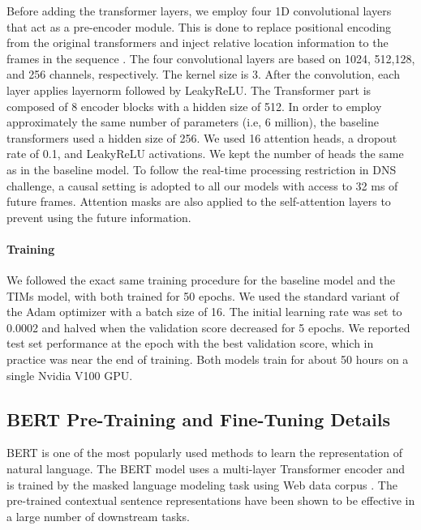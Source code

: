 Before adding the transformer layers, we employ four 1D convolutional layers that act as a pre-encoder module. This is done to replace positional encoding from the original transformers and inject relative location information to the frames in the sequence \citep{kim2020t, fu2020boosting}.
The four convolutional layers are based on 1024, 512,128, and 256 channels, respectively. The kernel size is 3. After the convolution, each layer applies layernorm followed by LeakyReLU.
The Transformer part is composed of 8 encoder blocks with a hidden size of 512. In order to employ approximately the same number of parameters (i.e, 6 million), the baseline transformers used a hidden size of 256. We used 16 attention heads, a dropout rate of 0.1, and LeakyReLU activations. We kept the number of heads the same as in the baseline model.  To follow the real-time processing restriction in DNS challenge, a causal setting is adopted to all our models with access to 32 ms of future frames. Attention masks are also applied to the self-attention layers to prevent using the future information.

\paragraph{Training}
We followed the exact same training procedure for the baseline model and the TIMs model, with both trained for 50 epochs.   We used the standard variant of the Adam optimizer with a batch size of 16. The initial learning rate was set to 0.0002 and halved when the validation score decreased for 5 epochs.   We reported test set performance at the epoch with the best validation score, which in practice was near the end of training.  Both models train for about 50 hours on a single Nvidia V100 GPU.  



   

\subsection{BERT Pre-Training and Fine-Tuning Details}

BERT \citep{devlin2018bert} is one of the most popularly used methods to learn the representation of natural language. The BERT model uses a multi-layer Transformer encoder and is trained by the masked language modeling task using Web data corpus \citep{liu2019roberta}. The pre-trained contextual sentence representations have been shown to be effective in a large number of downstream tasks. 

